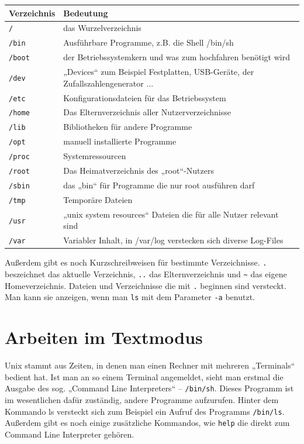 \begin{table}
\centering
\begin{tabular}{l|l}
Verzeichnis & Bedeutung \\ \hline
\lstinline$/$ & das Wurzelverzeichnis \\
\lstinline$/bin$ & Ausführbare Programme, z.B. die Shell /bin/sh \\
\lstinline$/boot$ & der Betriebssystemkern und was zum hochfahren benötigt wird \\
\lstinline$/dev$ & „Devices“ zum Beispiel Festplatten, USB-Geräte, der Zufallszahlengenerator ...\\
\lstinline$/etc$ & Konfigurationsdateien für das Betriebssystem \\
\lstinline$/home$ & Das Elternverzeichnis aller Nutzerverzeichnisse \\
\lstinline$/lib$ & Bibliotheken für andere Programme \\
\lstinline$/opt$ & manuell installierte Programme \\
\lstinline$/proc$ & Systemressourcen \\
\lstinline$/root$ & Das Heimatverzeichnis des „root“-Nutzers \\
\lstinline$/sbin$ & das „bin“ für Programme die nur root ausführen darf \\
\lstinline$/tmp$ & Temporäre Dateien \\
\lstinline$/usr$ & „unix system resources“ Dateien die für alle Nutzer relevant sind \\
\lstinline$/var$ & Variabler Inhalt, in /var/log verstecken sich diverse Log-Files
\end{tabular}
\label{UNIX-Verzeichnisse}
\end{table}

Außerdem gibt es noch Kurzschreibweisen für bestimmte Verzeichnisse. \lstinline$.$ beszeichnet das aktuelle Verzeichnis, \lstinline$..$ das Elternverzeichnis und \lstinline$~$ das eigene Homeverzeichnis.
Dateien und Verzeichnisse die mit \lstinline$.$ beginnen sind versteckt. Man kann sie anzeigen, wenn man \lstinline$ls$ mit dem Parameter \lstinline$-a$ benutzt.

\section{Arbeiten im Textmodus}
Unix stammt aus Zeiten, in denen man einen Rechner mit mehreren „Terminals“ bedient hat. 
Ist man an so einem Terminal angemeldet, sieht man erstmal die Ausgabe des sog. „Command Line Interpreters“ – \lstinline$/bin/sh$.
Dieses Programm ist im wesentlichen dafür zuständig, andere Programme aufzurufen. Hinter dem Kommando ls versteckt sich zum Beispiel ein Aufruf des Programms \lstinline$/bin/ls$. Außerdem gibt es noch einige zusätzliche Kommandos, wie \lstinline$help$ die direkt zum Command Line Interpreter gehören. 

